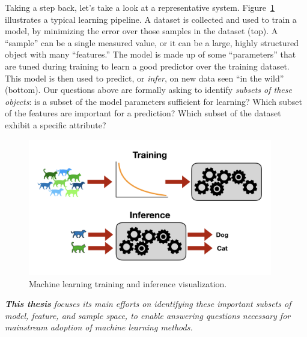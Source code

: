 Taking a step back, let's take a look at a representative system. Figure~\ref{fig:dl} illustrates a typical learning pipeline. 
A dataset is collected and used to train a model, by minimizing the error over
those samples in the dataset (top).
A ``sample'' can be a single measured value, or it can
be a large, highly structured object with many ``features.''
The model is made up of some ``parameters'' that are 
tuned during training to learn a good predictor over the training dataset.
This model is then used to predict, or \textit{infer}, on new
data seen ``in the wild'' (bottom).
Our questions above are formally asking to identify \textit{subsets of these objects}: is a subset of the model parameters sufficient for learning? Which subset of the features are important for a prediction? Which subset of the dataset exhibit a specific attribute?
\begin{figure}
    \centering
    \includegraphics[trim={0 3cm 0 3cm},clip,width=0.95\textwidth]{1_intro/figs/dl.png}
    \caption[Modern machine learning pipelines]{Machine learning training and inference visualization.}
    \label{fig:dl}
\end{figure}

\newpage
\begin{mdframed}[style=MyFrame]
\em 
\textbf{This thesis} focuses its main efforts on identifying these important subsets of model, feature, and sample space, to enable answering questions necessary for mainstream adoption of machine learning methods.
\end{mdframed}

